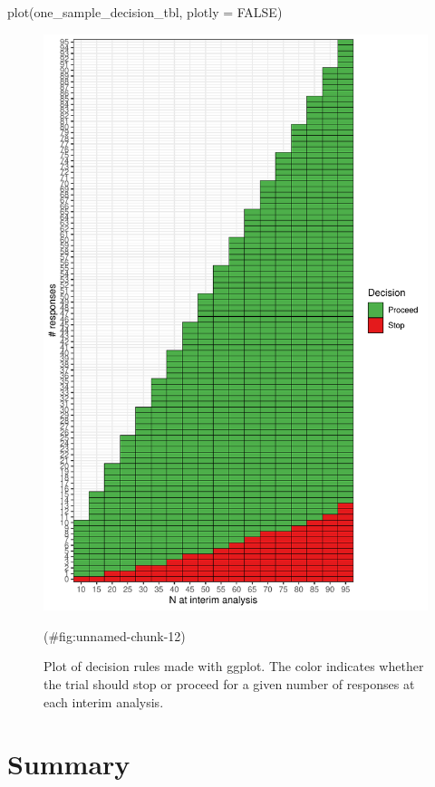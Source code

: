 \begin{Schunk}
\begin{Sinput}
plot(one_sample_decision_tbl, plotly = FALSE)
\end{Sinput}
\begin{figure}
\includegraphics{zabor-hobbs-kane_files/figure-latex/unnamed-chunk-12-1} \caption[Plot of decision rules made with ggplot]{Plot of decision rules made with ggplot. The color indicates whether the trial should stop or proceed for a given number of responses at each interim analysis.}(\#fig:unnamed-chunk-12)
\end{figure}
\end{Schunk}

\hypertarget{summary}{%
\section{Summary}\label{summary}}


